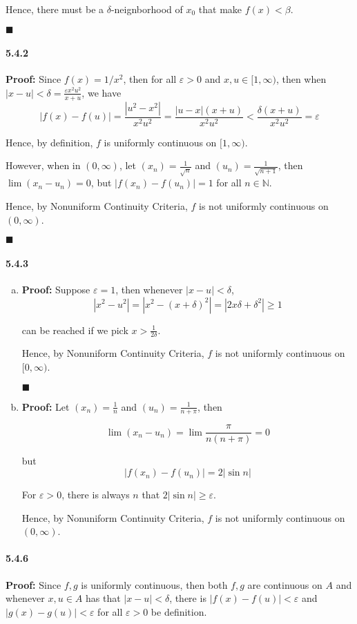 \documentclass[11pt]{article}
\newcommand{\qed}{
	\begin{flushright}
		$\blacksquare$
	\end{flushright}}
\begin{document}
		Hence, there must be a $\delta$-neignborhood of $x_0$ that make $f(x) < \beta$.
		\qed
	\paragraph{5.4.2}\textbf{Proof:}
		Since $f(x) = 1/x^2$, then for all $\varepsilon > 0$ and $x, u \in [1, \infty)$, then when $|x - u| < \delta = \frac{\varepsilon x^2u^2}{x + u}$, we have 
		\[|f(x) - f(u)| = \frac{|u^2	 - x^2|}{x^2u^2} =  \frac{|u - x|(x + u)}{x^2u^2} < \frac{\delta(x + u)}{x^2u^2} = \varepsilon \]
		
		Hence, by definition, $f$ is uniformly continuous on $[1, \infty)$.
		
		However, when in $(0, \infty)$, let $(x_n) = \frac{1}{\sqrt{n}}$ and $(u_n) = \frac{1}{\sqrt{n + 1}}$, then $\lim (x_n - u_n) = 0$, but $|f(x_n) - f(u_n)| = 1$ for all $n \in \mathbb{N}$. 
		
		Hence, by Nonuniform Continuity Criteria, $f$ is not uniformly continuous on $(0, \infty)$.
		\qed 
	\paragraph{5.4.3}
		\begin{enumerate}[(a)]
			\item \textbf{Proof:}
					Suppose $\varepsilon = 1$, then whenever $|x - u| < \delta$,
					\[|x^2 - u^2| = |x^2 - (x + \delta)^2| = |2x\delta + \delta^2| \geq 1\]
					
					can be reached if we pick $x > \frac{1}{2\delta}$.
					
					Hence, by Nonuniform Continuity Criteria, $f$ is not uniformly continuous on $[0, \infty)$.
					\qed
			\item \textbf{Proof:}
				Let $(x_n) = \frac{1}{n}$ and $(u_n) = \frac{1}{n + \pi}$, then
				
				\[\lim(x_n - u_n) = \lim \frac{\pi}{n(n + \pi)} = 0\]
				
				but
				\[|f(x_n) - f(u_n)| = 2|\sin n|\]
				
				For $\varepsilon > 0$, there is always $n$ that $2|\sin n| \geq \varepsilon$.
				
				Hence, by Nonuniform Continuity Criteria, $f$ is not uniformly continuous on $(0, \infty)$.
				
		\end{enumerate}
	\paragraph{5.4.6}\textbf{Proof:}
		Since $f, g$ is uniformly continuous, then both $f, g$ are continuous on $A$ and whenever $x, u \in A$ has that $|x - u| < \delta$, there is $|f(x) - f(u)| < \varepsilon$ and $|g(x) - g(u)| < \varepsilon$ for all $\varepsilon > 0$ be definition.
		
\end{document}
